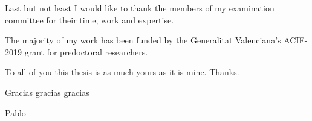 Last but not least I would like to thank the members of my examination committee for their time, work and expertise.

The majority of my work has been funded by the Generalitat Valenciana's ACIF-2019 grant for predoctoral researchers.


To all of you this thesis is as much yours as it is mine. Thanks.

Gracias gracias gracias

Pablo






